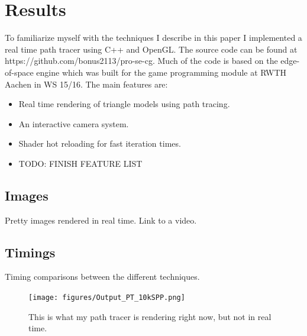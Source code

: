 \documentclass{ACGSeminar}
\begin{document}
\section{Results} \label{results}
To familiarize myself with the techniques I describe in this paper I implemented a real time path tracer using C++ and OpenGL. The source code can be found at https://github.com/bonus2113/pro-se-cg.
Much of the code is based on the edge-of-space engine \cite{edge_of_space} which was built for the game programming module at RWTH Aachen in WS 15/16.
The main features are:
\begin{itemize}
\item Real time rendering of triangle models using path tracing.
\item An interactive camera system.
\item Shader hot reloading for fast iteration times.
\item TODO: FINISH FEATURE LIST
\end{itemize}

\subsection{Images}
Pretty images rendered in real time. Link to a video.
\subsection{Timings}
Timing comparisons between the different techniques.

\begin{figure}[htb!]
  \begin{centering}
    \texttt{[image: figures/Output\_PT\_10kSPP.png]}\par
  \end{centering}
  \caption{This is what my path tracer is rendering right now, but not in real time.}
  \label{fig:pathtraced}
\end{figure}


\printbibliography
\end{document}
